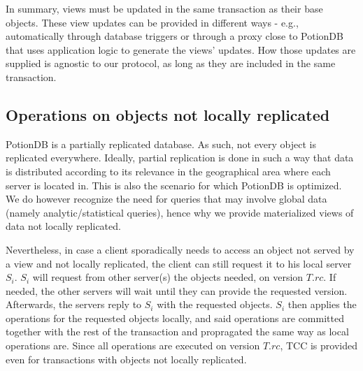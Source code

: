 \documentclass[sigplan,10pt]{acmart}
\begin{document}
In summary, views must be updated in the same transaction as their base objects.
These view updates can be provided in different ways - e.g., automatically through database triggers \cite{oracleTriggers, dbtoaster} or through a proxy close to PotionDB that uses application logic to generate the views' updates.
How those updates are supplied is agnostic to our protocol, as long as they are included in the same transaction.

\subsection{Operations on objects not locally replicated}
\label{subsec:operationsNonLocal}

PotionDB is a partially replicated database.
As such, not every object is replicated everywhere.
Ideally, partial replication is done in such a way that data is distributed according to its relevance in the geographical area where each server is located in.
This is also the scenario for which PotionDB is optimized.
We do however recognize the need for queries that may involve global data (namely analytic/statistical queries), hence why we provide materialized views of data not locally replicated.

Nevertheless, in case a client sporadically needs to access an object not served by a view and not locally replicated, the client can still request it to his local server $S_i$.
$S_i$ will request from other server(s) the objects needed, on version $T.rc$.
If needed, the other servers will wait until they can provide the requested version.
Afterwards, the servers reply to $S_i$ with the requested objects.
$S_i$ then applies the operations for the requested objects locally, and said operations are committed together with the rest of the transaction and propragated the same way as local operations are.
Since all operations are executed on version $T.rc$, TCC is provided even for transactions with objects not locally replicated.
\end{document}
